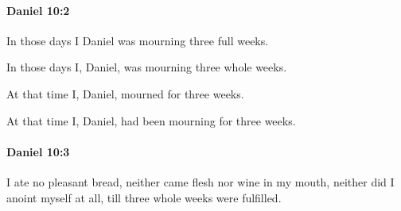 		\paragraph{Daniel 10:2} %
			\label{DANIEL-10-2}

			In those days I Daniel was mourning three full weeks.

			\begin{versebox}
					\item[BHS] 
					\item[LXX] 
					\item[ASV] In those days I, Daniel, was mourning three whole weeks.
					\item[NIV] At that time I, Daniel, mourned for three weeks.
					\item[NRSV] At that time I, Daniel, had been mourning for three weeks.
			\end{versebox}

		\paragraph{Daniel 10:3} %
			\label{DANIEL-10-3}

			I ate no pleasant bread, neither came flesh nor wine in my mouth, neither did I anoint myself at all, till three whole weeks were fulfilled.

